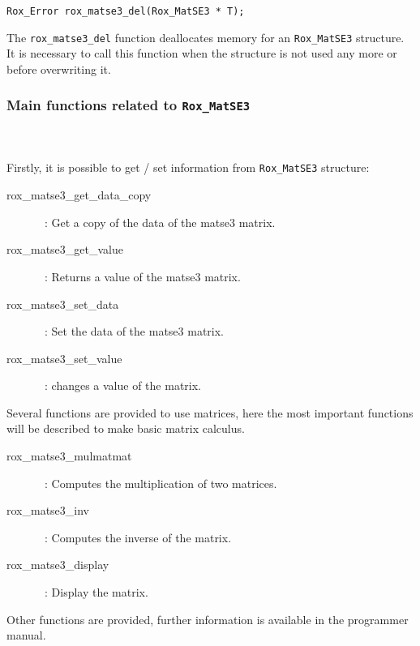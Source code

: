 

\begin{lstlisting}
Rox_Error rox_matse3_del(Rox_MatSE3 * T);
\end{lstlisting}
The \lstinline$rox_matse3_del$ function deallocates memory for an \lstinline$Rox_MatSE3$ structure. It is necessary to call this function when the
structure is not used any more or before overwriting it.

\subsubsection{Main functions related to {\tt Rox\_MatSE3}}
\label{sss:matse3_methods}
~\\~\\

Firstly, it is possible to get / set information from \lstinline$Rox_MatSE3$ structure:
\begin{description}
  \item[rox\_matse3\_get\_data\_copy]~: Get a copy of the data of the matse3 matrix.
  \item[rox\_matse3\_get\_value]~: Returns a value of the matse3 matrix.
  \item[rox\_matse3\_set\_data]~: Set the data of the matse3 matrix.
  \item[rox\_matse3\_set\_value]~: changes a value of the matrix.
\end{description}

Several functions are provided to use matrices, here the most important functions will be described to make basic matrix calculus.
\begin{description}
  \item[rox\_matse3\_mulmatmat]~: Computes the multiplication of two matrices.
  \item[rox\_matse3\_inv]~: Computes the inverse of the matrix.
  \item[rox\_matse3\_display]~: Display the matrix.
\end{description}

Other functions are provided, further information is available in the programmer manual.
